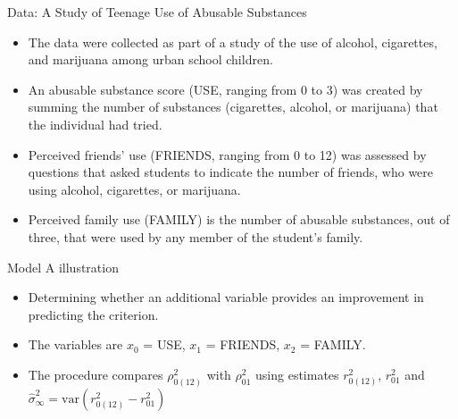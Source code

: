 \documentclass[10pt,pdf]{beamer}
\newcommand{\var}{\mathrm{var}}
\begin{document}
\begin{frame}[t]{Data: A Study of Teenage Use of Abusable Substances}

\begin{itemize}
  \setlength{\itemsep}{15pt}
  \item The data were collected as part of a study of the use of alcohol, cigarettes, and marijuana among urban school children.
  \item An abusable substance score (USE, ranging from 0 to 3) was created by summing the number of substances (cigarettes, alcohol, or marijuana) that the individual had tried.
  \item Perceived friends' use (FRIENDS, ranging from 0 to 12) was assessed by questions that asked students to indicate the number of friends, who were using alcohol, cigarettes, or marijuana.
  \item Perceived family use (FAMILY) is the number of abusable substances, out of three, that were used by any member of the student's family.
\end{itemize}



\end{frame}


\begin{frame}[t]{Model A illustration}

\begin{itemize}
  \setlength{\itemsep}{15pt}
  \item Determining whether an additional variable provides an improvement in predicting the criterion.
  \item The variables are $x_0$ = USE, $x_1$ = FRIENDS, $x_2$ = FAMILY.
  \item The procedure compares $\rho_{0(12)}^2$ with $\rho_{01}^2$ using estimates $r_{0(12)}^2$, $r_{01}^2$ and $\hat{\sigma}_{\infty}^2 = \var(r_{0(12)}^2 - r_{01}^2)$
\end{itemize}

\end{frame}
\end{document}
